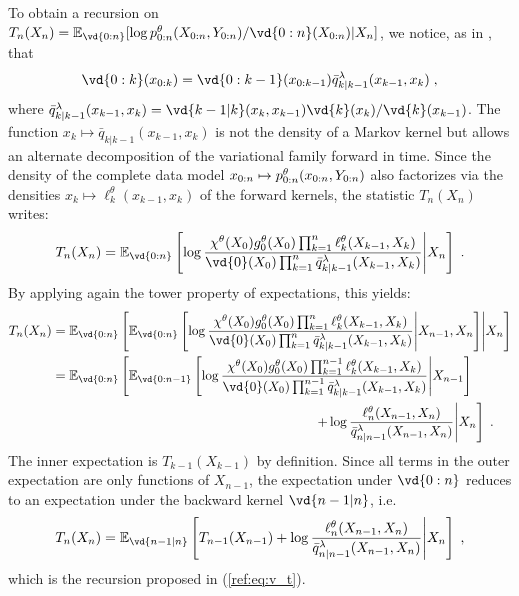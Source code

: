 \documentclass{article}
\begin{document}
To obtain a recursion on $T_n(X_n) = \pE_{\vd{0:n}}[\log p^{\parvec}_{0:n}(X_{0:n},Y_{0:n})/\vd{0:n}(X_{0:n}) \vert X_n]$, we notice, as in \cite{campbell2021online}, that $$
\vd{0:k}(x_{0:k}) = \vd{0:k-1}(x_{0:k-1})\bar{q}_{k\vert k-1}^\lambda(x_{k-1}, x_k) \eqsp,
$$ where $\bar{q}_{k\vert k-1}^\lambda(x_{k-1}, x_k) = \vd{k-1 \vert k}(x_k, x_{k-1})  \vd{k}(x_k) / \vd{k}(x_{k-1})$. The function $x_k \mapsto \bar{q}_{k\vert k-1}(x_{k-1}, x_k)$ is not the density of a Markov kernel but allows an alternate decomposition of the variational family forward in time. Since the density of the complete data model $x_{0:n}\mapsto p^{\theta}_{0:n}(x_{0:n},Y_{0:n})$ also factorizes via the densities $x_k\mapsto \ell_k^\theta(x_{k-1}, x_k)$ of the forward kernels, the statistic $T_n(X_n)$ writes: 
$$
T_n(X_n) = \pE_{\vd{0:n}}\left[\log \frac{\chi^\theta(X_0) \md{0}{\theta}(X_0) \prod_{k=1}^n \ell_k^\theta(X_{k-1}, X_k)}{\vd{0}(X_0)\prod_{k=1}^n \bar{q}_{k\vert k-1}^\lambda(X_{k-1}, X_k)} \middle\vert X_n\right]\eqsp.
$$
By applying again the tower property of expectations, this yields:
\begin{align*}
T_n(X_n) &= \pE_{\vd{0:n}}\left[\pE_{\vd{0:n}}\left[\log \frac{\chi^\theta(X_0) \md{0}{\theta}(X_0) \prod_{k=1}^n \ell_k^\theta(X_{k-1}, X_k)}{\vd{0}(X_0)\prod_{k=1}^n \bar{q}_{k\vert k-1}^\lambda(X_{k-1}, X_k)} \middle\vert X_{n-1}, X_n \right] \middle\vert X_n\right] \\
&= \pE_{\vd{0:n}}\left[\pE_{\vd{0:n-1}}\left[\log \frac{\chi^\theta(X_0) \md{0}{\theta}(X_0) \prod_{k=1}^{n-1} \ell_k^\theta(X_{k-1}, X_k)}{\vd{0}(X_0)\prod_{k=1}^{n-1} \bar{q}_{k\vert k-1}^\lambda(X_{k-1}, X_k)} \middle\vert X_{n-1} \right]\right.\\
&\left. \hspace{7cm}+ \log \frac{\ell_n^\theta(X_{n-1}, X_n)}{\bar{q}_{n\vert n-1}^\lambda(X_{n-1}, X_n)}\middle\vert X_n\right]\eqsp.
\end{align*}
The inner expectation is $T_{k-1}(X_{k-1})$ by definition. Since all terms in the outer expectation are only functions of $X_{n-1}$, the expectation under $\vd{0:n}$ reduces to an expectation under the backward kernel $\vd{n-1 \vert n}$, i.e. 
$$
T_n(X_n) = \pE_{\vd{n-1 \vert n}} \left[T_{n-1}(X_{n-1})  + \log \frac{\ell_n^\theta(X_{n-1}, X_n)}{\bar{q}_{n\vert n-1}^\lambda(X_{n-1}, X_n)}\middle\vert X_n\right]\eqsp,
$$
which is the recursion proposed in (\ref{ref:eq:v_t}).
\end{document}
